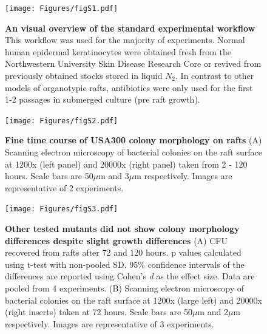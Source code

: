\documentclass[10pt,letterpaper]{article}
\begin{document}
\begin{figure}[H]
\begin{adjustwidth}{-2.25in}{0in}
\texttt{[image: Figures/figS1.pdf]}
\caption[An visual overview of the standard experimental workflow]{
\textbf{An visual overview of the standard experimental workflow}
This workflow was used for the majority of experiments. Normal human epidermal keratinocytes were obtained fresh from the Northwestern University Skin Disease Research Core or revived from previously obtained stocks stored in liquid $N_2$. In contrast to other models of organotypic rafts, antibiotics were only used for the first 1-2 passages in submerged culture (pre raft growth).}
\label{figS1}
\end{adjustwidth}
\end{figure}

\begin{figure}[H]
\begin{adjustwidth}{-2.25in}{0in}
\texttt{[image: Figures/figS2.pdf]}
\caption[Fine time course of USA300 colony morphology on rafts]{
\textbf{Fine time course of USA300 colony morphology on rafts} 
	(A) Scanning electron microscopy of bacterial colonies on the raft surface at 1200x (left panel) and 20000x (right panel) taken from 2 - 120 hours. Scale bars are 50$\mu$m and 3$\mu$m respectively. Images are representative of 2 experiments.}
    \label{figS2}
    \end{adjustwidth}
\end{figure}

\begin{figure}[H]
\begin{adjustwidth}{-2.25in}{0in}
\texttt{[image: Figures/figS3.pdf]}
\caption[Other tested mutants did not show colony morphology differences despite slight growth differences]{
	\textbf{Other tested mutants did not show colony morphology differences despite slight growth differences}
	(A) CFU recovered from rafts after 72 and 120 hours. p values calculated using t-test with non-pooled SD. 95\% confidence intervals of the differences are reported using Cohen's \textit{d} as the effect size. Data are pooled from 4 experiments.
	(B) Scanning electron microscopy of bacterial colonies on the raft surface at 1200x (large left) and 20000x (right inserts) taken at 72 hours. Scale bars are 50$\mu$m and 2$\mu$m respectively. Images are representative of 3 experiments.}
        \label{figS3}
        \end{adjustwidth}
\end{figure}
\end{document}
